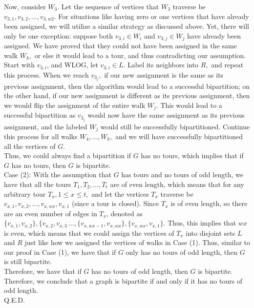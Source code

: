 \documentclass{article}
\begin{document}
\indent Now, consider $W_3.$ Let the sequence of vertices that $W_3$ traverse be $v_{3,1}, v_{3,2}, ..., v_{3,w2}.$ For situations like having zero or one vertices that have already been assigned, we will utilize a similar strategy as discussed above. Yet, there will only be one exception: suppose both $v_{3,i}\in W_i$ and $v_{3,j}\in W_j$ have already been assigned. We have proved that they could not have been assigned in the same walk $W_k,$ or else it would lead to a tour, and thus contradicting our assumption. Start with $v_{3,i}$, and WLOG, let $v_{3,i}\in L$. Label its neighbors into $R,$ and repeat this process. When we reach $v_{3_j},$ if our new assignment is the same as its previous assignment, then the algorithm would lead to a successful bipartition; on the other hand, if our new assignment is different as its previous assignment, then we would flip the assignment of the entire walk $W_j.$ This would lead to a successful bipartition as $v_{3_j}$ would now have the same assignment as its previous assignment, and the labeled $W_j$ would still be successfully bipartitioned. Continue this process for all walks $W_4, ..., W_k,$ and we will have successfully bipartitioned all the vertices of $G.$ \\[.2cm]
\indent Thus, we could always find a bipartition if $G$ has no tours, which implies that if $G$ has no tours, then $G$ is bipartite. \\[.3cm]
\indent Case (2): With the assumption that $G$ has tours and no tours of odd length, we have that all the tours $T_1, T_2, ..., T_t$ are of even length, which means that for any arbitrary tour $T_x, 1\leq x\leq t,$ and let the vertices $T_x$ traverse be $v_{x,1}, v_{x,2}, ..., v_{x,wx}, v_{x,1}$ (since a tour is closed). Since $T_x$ is of even length, so there are an even number of edges in $T_x$, denoted as $\{v_{x,1}, v_{x,2}\}, \{v_{x,2}, v_{x,3}\, ..., \{v_{x,wx-1}, v_{x,wx}\}, \{v_{x,wx}, v_{x,1}\}$. Thus, this implies that $wx$ is even, which means that we could assign the vertices of $T_x$ into disjoint sets $L$ and $R$ just like how we assigned the vertices of walks in Case (1). Thus, similar to our proof in Case (1), we have that if $G$ only has no tours of odd length, then $G$ is still bipartite.\\[.3cm]
Therefore, we have that if $G$ has no tours of odd length, then $G$ is bipartite. \\[.5cm]
Therefore, we conclude that a graph is bipartite if and only if it has no tours of odd length.\\[.5cm]
Q.E.D.
\end{document}
